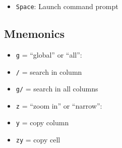 \documentclass[
  letterpaper,
  DIV=11,
  numbers=noendperiod]{scrartcl}
\providecommand{\tightlist}{%
  \setlength{\itemsep}{0pt}\setlength{\parskip}{0pt}}\usepackage{longtable,booktabs,array}
\begin{document}
\begin{itemize}
\tightlist
\item
  \texttt{Space}: Launch command prompt
\end{itemize}

\subsection{Mnemonics}\label{mnemonics}

\begin{itemize}
\tightlist
\item
  \texttt{g} = ``global'' or ``all'':
\item
  \texttt{/} = search in column
\item
  \texttt{g/} = search in all columns
\item
  \texttt{z} = ``zoom in'' or ``narrow'':
\item
  \texttt{y} = copy column
\item
  \texttt{zy} = copy cell
\end{itemize}
\end{document}

